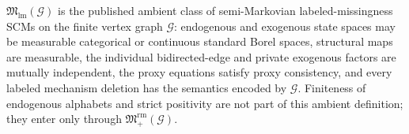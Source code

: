 \(\mathfrak M_{\mathrm{lm}}(\mathcal G)\) is the published ambient class of semi-Markovian labeled-missingness SCMs on the finite vertex graph \(\mathcal G\): endogenous and exogenous state spaces may be measurable categorical or continuous standard Borel spaces, structural maps are measurable, the individual bidirected-edge and private exogenous factors are mutually independent, the proxy equations satisfy proxy consistency, and every labeled mechanism deletion has the semantics encoded by \(\mathcal G\). Finiteness of endogenous alphabets and strict positivity are not part of this ambient definition; they enter only through \(\mathfrak M_{+}^{\mathrm{rm}}(\mathcal G)\).